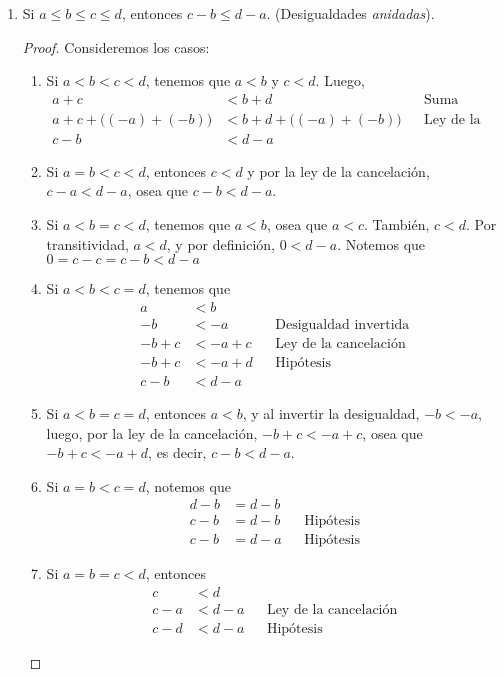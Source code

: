 \begin{enumerate}[label=\alph*)]
\item Si $a\leq b\leq c\leq d$, entonces $c-b \leq d-a$. (Desigualdades \textit{anidadas}).
\begin{proof}\leavevmode
  Consideremos los casos:
  \begin{enumerate}[label=\roman*)]
    \item Si $a<b<c<d$, tenemos que $a<b$ y $c<d$. Luego,
    \begin{align*}
      a+c &< b+d && \text{Suma vertical de desigualdades}\\
      a+c + \big((-a)+(-b)\big) &< b+d + \big((-a)+(-b)\big) && \text{Ley de la cancelación}\\
      c - b &< d - a
    \end{align*}
    \item Si $a=b<c<d$, entonces $c<d$ y por la ley de la cancelación, $c-a<d-a$, osea que $c-b<d-a$.
    \item Si $a<b=c<d$, tenemos que $a<b$, osea que $a<c$. También, $c<d$. Por transitividad, $a<d$, y por definición, $0<d-a$. Notemos que $0=c-c=c-b<d-a$
    \item Si $a<b<c=d$, tenemos que
    \begin{align*}
      a &< b\\
      -b &< -a && \text{Desigualdad invertida}\\
      -b + c &< -a + c && \text{Ley de la cancelación}\\
      -b + c &< -a + d && \text{Hipótesis}\\
      c - b &< d - a
    \end{align*}
    \item Si $a<b=c=d$, entonces $a<b$, y al invertir la desigualdad, $-b<-a$, luego, por la ley de la cancelación, $-b + c < -a +c$, osea que $-b + c < -a +d$, es decir, $c-b<d-a$.
    \item Si $a=b<c=d$, notemos que
    \begin{align*}
      d - b &= d -b\\
      c - b &= d - b && \text{Hipótesis}\\
      c - b &= d - a && \text{Hipótesis}
    \end{align*}
    \item Si $a=b=c<d$, entonces
    \begin{align*}
      c &< d\\
      c - a &< d - a && \text{Ley de la cancelación}\\
      c - d &< d- a && \text{Hipótesis}
    \end{align*}
  \end{enumerate}
\end{proof}


\end{enumerate}
